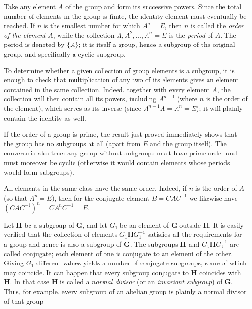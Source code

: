 Take any element $A$ of the group and form its successive powers. Since the total number of elements in the group is finite, the identity element must eventually be reached. If $n$ is the smallest number for which $A^n=E$, then $n$ is called the \emph{order of the element} $A$, while the collection $A,A^2,\ldots,A^n=E$ is the \emph{period} of $A$. The period is denoted by $\{A\}$; it is itself a group, hence a subgroup of the original group, and specifically a cyclic subgroup.

To determine whether a given collection of group elements is a subgroup, it is enough to check that multiplication of any two of its elements gives an element contained in the same collection. Indeed, together with every element $A$, the collection will then contain all its powers, including $A^{n-1}$ (where $n$ is the order of the element), which serves as its inverse (since $A^{n-1}A=A^n=E$); it will plainly contain the identity as well.



If the order of a group is prime, the result just proved immediately shows that the group has no subgroups at all (apart from $E$ and the group itself). The converse is also true: any group without subgroups must have prime order and must moreover be cyclic (otherwise it would contain elements whose periods would form subgroups).



All elements in the same class have the same order. Indeed, if $n$ is the order of $A$ (so that $A^n=E$), then for the conjugate element $B=CAC^{-1}$ we likewise have $(CAC^{-1})^n=CA^nC^{-1}=E$.

Let $\boldsymbol{H}$ be a subgroup of $\boldsymbol{G}$, and let $G_1$ be an element of $\boldsymbol{G}$ outside $\boldsymbol{H}$. It is easily verified that the collection of elements $G_1\boldsymbol{H}G_1^{-1}$ satisfies all the requirements for a group and hence is also a subgroup of $\boldsymbol{G}$. The subgroups $\boldsymbol{H}$ and $G_1\boldsymbol{H}G_1^{-1}$ are called conjugate; each element of one is conjugate to an element of the other. Giving $G_1$ different values yields a number of conjugate subgroups, some of which may coincide. It can happen that every subgroup conjugate to $\boldsymbol{H}$ coincides with $\boldsymbol{H}$. In that case $\boldsymbol{H}$ is called a \emph{normal divisor} (or an \emph{invariant subgroup}) of $\boldsymbol{G}$. Thus, for example, every subgroup of an abelian group is plainly a normal divisor of that group.


